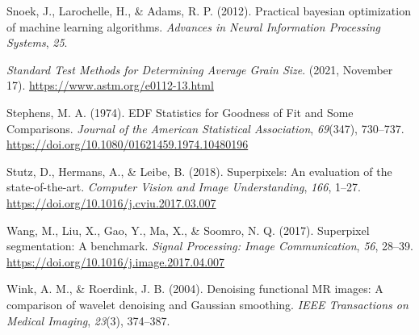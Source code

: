 \documentclass[
  12pt,
]{book}
\newlength{\cslhangindent}
\newlength{\cslentryspacingunit} %
\newenvironment{CSLReferences}[2] %
 {%
  \setlength{\parindent}{0pt}
  \ifodd #1
  \let\oldpar\par
  \def\par{\hangindent=\cslhangindent\oldpar}
  \fi
  \setlength{\parskip}{#2\cslentryspacingunit}
 }%
 {}
\begin{document}
\begin{CSLReferences}{1}{0}
\leavevmode{}%
Snoek, J., Larochelle, H., \& Adams, R. P. (2012). Practical bayesian optimization of machine learning algorithms. \emph{Advances in Neural Information Processing Systems}, \emph{25}.

\leavevmode{}%
\emph{Standard {Test Methods} for {Determining Average Grain Size}}. (2021, November 17). \url{https://www.astm.org/e0112-13.html}

\leavevmode{}%
Stephens, M. A. (1974). {EDF Statistics} for {Goodness} of {Fit} and {Some Comparisons}. \emph{Journal of the American Statistical Association}, \emph{69}(347), 730--737. \url{https://doi.org/10.1080/01621459.1974.10480196}

\leavevmode{}%
Stutz, D., Hermans, A., \& Leibe, B. (2018). Superpixels: {An} evaluation of the state-of-the-art. \emph{Computer Vision and Image Understanding}, \emph{166}, 1--27. \url{https://doi.org/10.1016/j.cviu.2017.03.007}

\leavevmode{}%
Wang, M., Liu, X., Gao, Y., Ma, X., \& Soomro, N. Q. (2017). Superpixel segmentation: {A} benchmark. \emph{Signal Processing: Image Communication}, \emph{56}, 28--39. \url{https://doi.org/10.1016/j.image.2017.04.007}

\leavevmode{}%
Wink, A. M., \& Roerdink, J. B. (2004). Denoising functional {MR} images: A comparison of wavelet denoising and {Gaussian} smoothing. \emph{IEEE Transactions on Medical Imaging}, \emph{23}(3), 374--387.

\end{CSLReferences}
\end{document}
